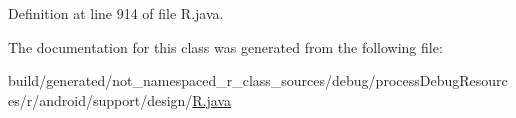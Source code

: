 Definition at line 914 of file R.\+java.



The documentation for this class was generated from the following file\+:\begin{DoxyCompactItemize}
\item 
build/generated/not\+\_\+namespaced\+\_\+r\+\_\+class\+\_\+sources/debug/process\+Debug\+Resources/r/android/support/design/\mbox{\hyperlink{android_2support_2design_2_r_8java}{R.\+java}}\end{DoxyCompactItemize}
